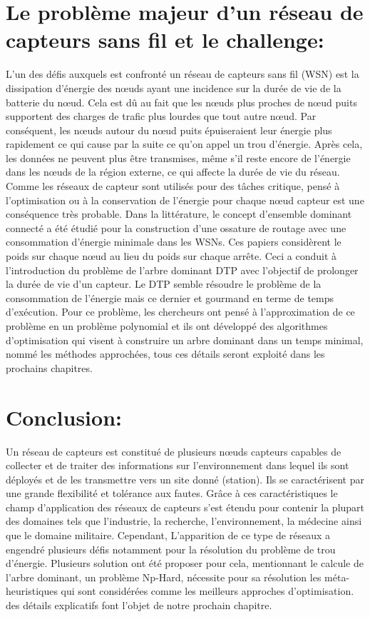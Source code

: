\section{Le problème majeur d’un réseau de capteurs sans fil et le challenge:}
L'un des défis auxquels est confronté un réseau de capteurs sans fil (WSN) est la dissipation d'énergie des nœuds ayant une incidence sur la durée de vie de la batterie du nœud. Cela est dû au fait que les nœuds plus proches de nœud puits supportent des charges de trafic plus lourdes que tout autre nœud. Par conséquent, les nœuds autour du nœud puits épuiseraient leur énergie plus rapidement ce qui cause par la suite ce qu’on appel un trou d’énergie. Après cela, les données ne peuvent plus être transmises, même s'il reste encore de l'énergie dans les nœuds de la région externe, ce qui affecte la durée de vie du réseau. Comme les réseaux de capteur sont utilisés pour des tâches critique, pensé à l’optimisation ou à la conservation de  l’énergie pour chaque nœud capteur est une conséquence très probable.
Dans la littérature, le concept d’ensemble dominant connecté \cite{guha1998approximation,park2007dominating,thai2008construction,wan2002distributed} a été étudié pour la construction d’une ossature de routage avec une consommation d’énergie minimale dans les WSNs. Ces papiers considèrent le poids sur chaque nœud au lieu du poids sur chaque arrête. Ceci a conduit à l'introduction du problème de l’arbre dominant DTP \cite{shin2010approximation,zhang2008new} avec l'objectif de prolonger la durée de vie d’un capteur. \cite{sundar2014steady}
Le DTP semble résoudre le problème de la consommation de l’énergie mais ce dernier et gourmand en terme de temps d’exécution. Pour ce problème, les chercheurs ont pensé à l’approximation de ce problème en un problème polynomial et ils ont développé des algorithmes  d’optimisation qui visent à construire un arbre dominant dans un temps minimal, nommé les méthodes approchées, tous ces détails seront exploité dans les prochains chapitres.

\section{Conclusion:}
Un réseau de capteurs est constitué de plusieurs nœuds capteurs capables  de collecter et de traiter des informations sur l'environnement dans lequel ils sont déployés et de les transmettre vers un site donné (station). Ils se caractérisent par une grande flexibilité et tolérance aux fautes. Grâce à ces caractéristiques le champ d'application des réseaux de capteurs s'est étendu pour contenir la plupart des domaines tels que l’industrie, la recherche, l’environnement, la médecine ainsi que le domaine militaire. Cependant, L’apparition de ce type de réseaux a engendré plusieurs défis notamment pour la résolution du problème de trou d’énergie. Plusieurs solution ont été proposer pour cela, mentionnant le calcule de l’arbre dominant, un problème Np-Hard, nécessite pour sa résolution les méta-heuristiques qui sont considérées comme les meilleurs approches d’optimisation. des détails explicatifs font l’objet de notre prochain chapitre.


